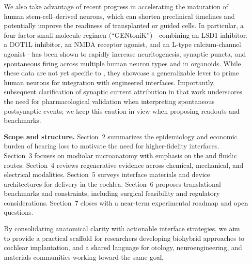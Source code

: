 We also take advantage of recent progress in accelerating the maturation of human stem-cell–derived neurons, which can shorten preclinical timelines and potentially improve the readiness of transplanted or guided cells. In particular, a four-factor small-molecule regimen (``GENtoniK'')---combining an LSD1 inhibitor, a DOT1L inhibitor, an NMDA receptor agonist, and an L-type calcium-channel agonist---has been shown to rapidly increase neuritogenesis, synaptic puncta, and spontaneous firing across multiple human neuron types and in organoids.\citep{Hergenreder2024NatBiotech} While these data are not yet specific to \SGNs, they showcase a generalizable lever to prime human neurons for integration with engineered interfaces. Importantly, subsequent clarification of synaptic current attribution in that work underscores the need for pharmacological validation when interpreting spontaneous postsynaptic events; we keep this caution in view when proposing readouts and benchmarks.

\textbf{Scope and structure.} Section~2 summarizes the epidemiology and economic burden of hearing loss to motivate the need for higher-fidelity interfaces. Section~3 focuses on modiolar microanatomy with emphasis on the \CPS and fluidic routes. Section~4 reviews regenerative evidence across chemical, mechanical, and electrical modalities. Section~5 surveys interface materials and device architectures for delivery in the cochlea. Section~6 proposes translational benchmarks and constraints, including surgical feasibility and regulatory considerations. Section~7 closes with a near-term experimental roadmap and open questions.

By consolidating anatomical clarity with actionable interface strategies, we aim to provide a practical scaffold for researchers developing biohybrid approaches to cochlear implantation, and a shared language for otology, neuroengineering, and materials communities working toward the same goal.
